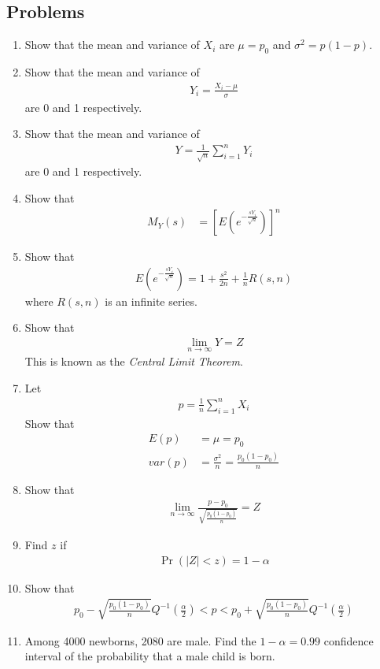 \documentclass[journal,12pt,onecolumn]{IEEEtran}
\renewcommand\thesection{\arabic{section}}
\renewcommand\thesubsection{\thesection.\arabic{subsection}}
\providecommand{\pr}[1]{\ensuremath{\Pr\left(#1\right)}}
\providecommand{\sbrak}[1]{\ensuremath{{}\left[#1\right]}}
\providecommand{\brak}[1]{\ensuremath{\left(#1\right)}}
\theoremstyle{remark}
\providecommand{\abs}[1]{\left\vert#1\right\vert}
\numberwithin{equation}{section}
\begin{document}
 \subsection{Problems}
\begin{enumerate}[label=\arabic*.,ref=\thesubsection.\theenumi]
\item Show that the mean and variance of $X_i$ are $\mu = p_0$ and $\sigma^2 = p \brak{1-p}$. 
\item Show that the mean and variance of 
\begin{align}
	Y_i = \frac{X_i - \mu}{\sigma}
\end{align}
are 0 and 1 respectively.
\item Show that the mean and variance of 
\begin{align}
	Y = \frac{1}{\sqrt{n}}\sum_{i=1}^{n}Y_i
\end{align}
are 0 and 1 respectively.
\item Show that
\begin{align}
	M_Y(s) &= \sbrak{E\brak{e^{-\frac{sY_i}{\sqrt{n}}}}}^n
\end{align}
\item Show that 
\begin{align}
	E\brak{e^{-\frac{sY_i}{\sqrt{n}}}} = 1 + \frac{s^2}{2n}+ \frac{1}{n}R(s,n)
\end{align}
		where $R(s,n)$ is an infinite series.
	\item Show that 
\begin{align}
	\lim_{n \to \infty} Y = Z
\end{align}
		This is known as the {\em Central Limit Theorem}.
	\item Let
		\begin{align}
	p = \frac{1}{n}\sum_{i=1}^{n}X_i
\end{align}
Show that 
		\begin{align}
			E\brak{p} &= \mu = p_0
			\\
			var\brak{p} &= \frac{\sigma^2}{n} = \frac{p_0\brak{1-p_0}}{n}
\end{align}
\item Show that 
\begin{align}
	\lim_{n \to \infty} \frac{p-p_0}{\sqrt{\frac{p_0\brak{1-p_0}}{n}}} = Z
\end{align}
\item Find $z$ if 
\begin{align}
	\pr{\abs{Z} < z} = 1-\alpha
\end{align}
\item Show that 
\begin{align}
	p_0 - \sqrt{\frac{p_0\brak{1-p_0}}{n}}Q^{-1}\brak{\frac{\alpha}{2}}
	< p <
	p_0 + \sqrt{\frac{p_0\brak{1-p_0}}{n}}Q^{-1}\brak{\frac{\alpha}{2}}
\end{align}
\item Among 4000 newborns, 2080 are male.  Find the $1 -\alpha = 0.99$ confidence interval of the probability that a male child is born.
 \end{enumerate}
\end{document}
